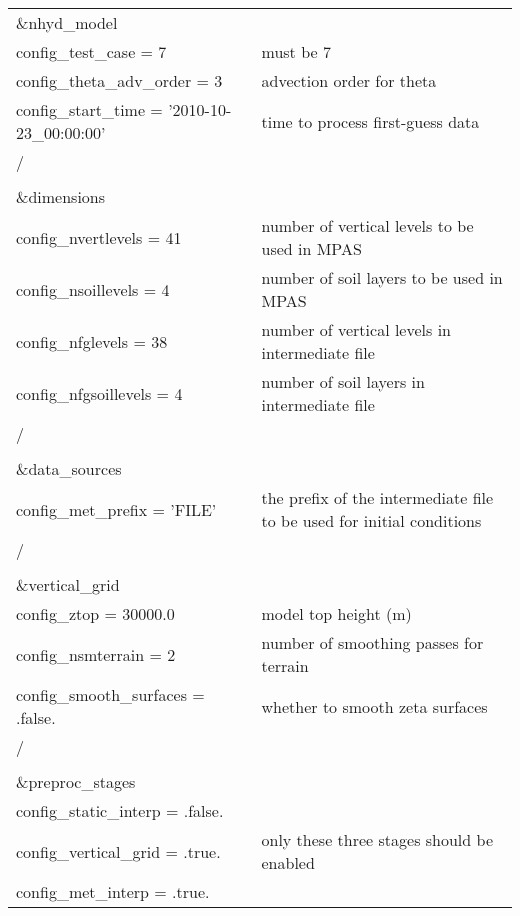 \begin{longtable}{p{3.0in} |p{3.25in}}

\&nhyd\_model\\
   config\_test\_case       = 7                      & must be 7 \\
   config\_theta\_adv\_order = 3                     & advection order for theta \\
   config\_start\_time      = '2010-10-23\_00:00:00' & time to process first-guess data \\
/\\
\\
\&dimensions\\
   config\_nvertlevels     = 41                      & number of vertical levels to be used in MPAS \\
   config\_nsoillevels     = 4                       & number of soil layers to be used in MPAS \\
   config\_nfglevels       = 38                      & number of vertical levels in intermediate file \\
   config\_nfgsoillevels   = 4                       & number of soil layers in intermediate file \\
/\\
\\
\&data\_sources\\
   config\_met\_prefix      = 'FILE'                 & the prefix of the intermediate file to be used for initial conditions \\
/\\
\\
\&vertical\_grid\\
   config\_ztop            = 30000.0                 & model top height (m) \\
   config\_nsmterrain      = 2                       & number of smoothing passes for terrain \\
   config\_smooth\_surfaces = .false.                 & whether to smooth zeta surfaces \\
/\\
\\
\&preproc\_stages                                    & \\
   config\_static\_interp   = .false.                & \\
   config\_vertical\_grid   = .true.                 & only these three stages should be enabled \\
   config\_met\_interp      = .true.                 & \\

\end{longtable}
